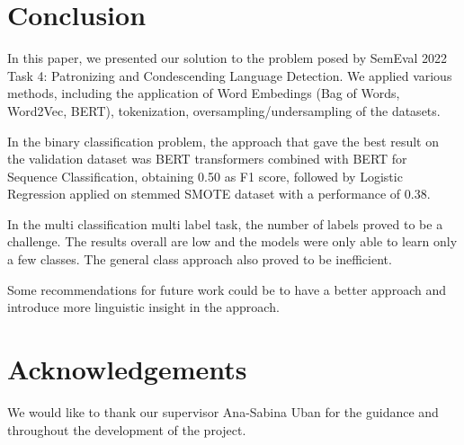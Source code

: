 \documentclass[11pt]{article}
\begin{document}
\section{Conclusion}

In this paper, we presented our solution to the problem posed by SemEval 2022 Task
4: Patronizing and Condescending Language Detection. We applied
various methods, including the application of Word Embedings (Bag of Words,
Word2Vec, BERT), tokenization, oversampling/undersampling of the datasets.

In the binary classification problem, the approach that gave the best result
on the validation dataset was BERT transformers combined with BERT for
Sequence Classification, obtaining 0.50 as F1 score, followed by Logistic Regression applied on stemmed SMOTE dataset with a performance of 0.38.

In the multi classification multi label task, the number of labels proved to
be a challenge. The results overall are low and the models were only able to learn
only a few classes. The general class approach also proved to be inefficient.


Some recommendations for future work could be to have a better approach and introduce
more linguistic insight in the approach.

\section*{Acknowledgements}

We would like to thank our supervisor Ana-Sabina Uban for the guidance and throughout
the development of the project.




\end{document}
